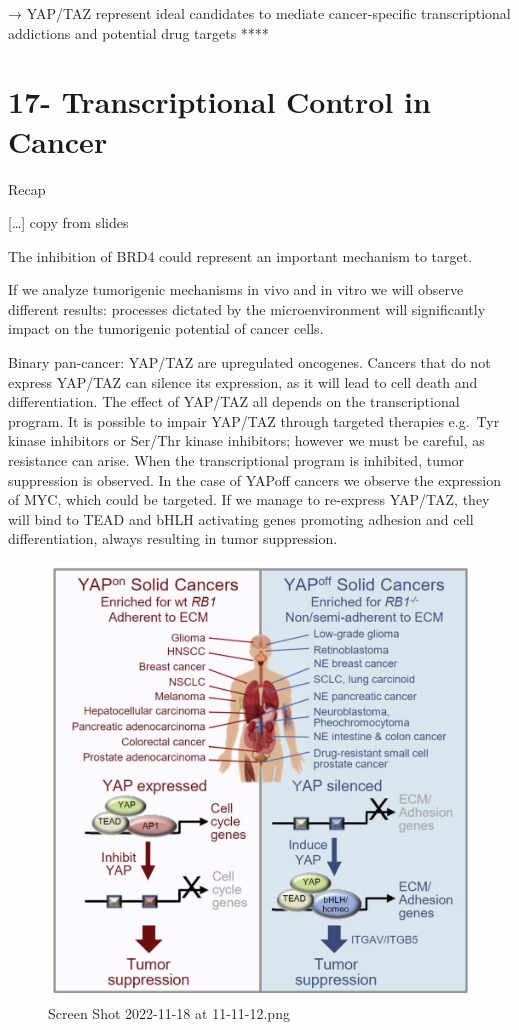 → YAP/TAZ represent ideal candidates to mediate cancer-specific transcriptional addictions
and potential drug targets
****

\hypertarget{transcriptional-control-in-cancer}{%
\section{17- Transcriptional Control in Cancer}\label{transcriptional-control-in-cancer}}

Recap

{[}\ldots{]} copy from slides

The inhibition of BRD4 could represent an important mechanism to target.

If we analyze tumorigenic mechanisms in vivo and in vitro we will observe different results: processes dictated by the microenvironment will significantly impact on the tumorigenic potential of cancer cells.

Binary pan-cancer: YAP/TAZ are upregulated oncogenes. Cancers that do not express YAP/TAZ can silence its expression, as it will lead to cell death and differentiation. The effect of YAP/TAZ all depends on the transcriptional program. It is possible to impair YAP/TAZ through targeted therapies e.g.~Tyr kinase inhibitors or Ser/Thr kinase inhibitors; however we must be careful, as resistance can arise. When the transcriptional program is inhibited, tumor suppression is observed. In the case of YAPoff cancers we observe the expression of MYC, which could be targeted. If we manage to re-express YAP/TAZ, they will bind to TEAD and bHLH activating genes promoting adhesion and cell differentiation, always resulting in tumor suppression.

\begin{figure}
\centering
\includegraphics{../_resources/Screen_Shot_2022-11-18_at_11-11-12.png}
\caption{Screen Shot 2022-11-18 at 11-11-12.png}
\end{figure}

